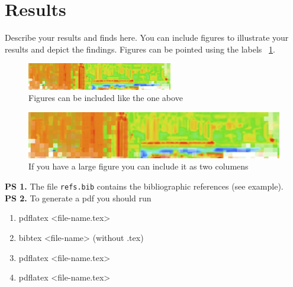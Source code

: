 \documentclass[10pt,twocolumn]{article}
\begin{document}
\section{Results}

Describe your results and finds here. You can include figures to illustrate your results
and depict the findings. Figures can be pointed using the labels ~\ref{fig-cusp}. 

\begin{figure}[!t]
  \begin{center}
    \includegraphics[width=2.5in]{cusp.png}
  \end{center}

  \caption{\small Figures can be included like the one above}
  \label{fig-cusp}
\end{figure}

\begin{figure}[!t]
  \begin{center}
    \includegraphics[width=6.5in]{cusp.png}
  \end{center}

  \caption{\small If you have a large figure you can include it as two columens}
  \label{fig-twocolumn}
\end{figure}

\noindent\textbf{PS 1.} The file \texttt{refs.bib} contains the bibliographic references (see example).\\

\noindent\textbf{PS 2.} To generate a pdf you should run
\begin{enumerate}
\item pdflatex <file-name.tex>
\item bibtex <file-name> (without .tex)
\item pdflatex <file-name.tex>
\item pdflatex <file-name.tex>
\end{enumerate}




\end{document}
